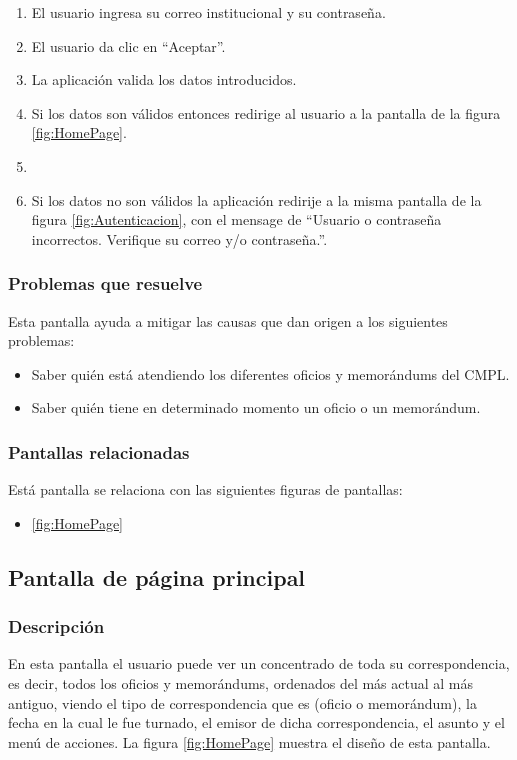 	\begin{enumerate}
		\item El usuario ingresa su correo institucional y su contraseña.
		\item El usuario da clic en ``Aceptar''.
		\item La aplicación valida los datos introducidos.
		\item Si los datos son válidos entonces redirige al usuario a la pantalla de la figura \ref{fig:HomePage}.
		\item \item Si los datos no son válidos la aplicación redirije a la misma pantalla de la figura \ref{fig:Autenticacion}, con el mensage de ``Usuario o contraseña incorrectos. Verifique su correo y/o contraseña.''.
	\end{enumerate}

\subsubsection{Problemas que resuelve}
Esta pantalla ayuda a mitigar las causas que dan origen a los siguientes problemas:

	\begin{itemize}
		\item Saber quién está atendiendo los diferentes oficios y memorándums del CMPL.
		\item Saber quién tiene en determinado momento un oficio o un memorándum.
	\end{itemize}

\subsubsection{Pantallas relacionadas}
Está pantalla se relaciona con las siguientes figuras de pantallas:
	\begin{itemize}
		\item \ref{fig:HomePage}
	\end{itemize}
\subsection{Pantalla de página principal}
\subsubsection{Descripción}
	En esta pantalla el usuario puede ver un concentrado de toda su correspondencia, es decir, todos los oficios y memorándums, ordenados del más actual al más antiguo, viendo el tipo de correspondencia que es (oficio o memorándum), la fecha en la cual le fue turnado, el emisor de dicha correspondencia, el asunto y el menú de acciones. La figura \ref{fig:HomePage} muestra el diseño de esta pantalla.		
		

